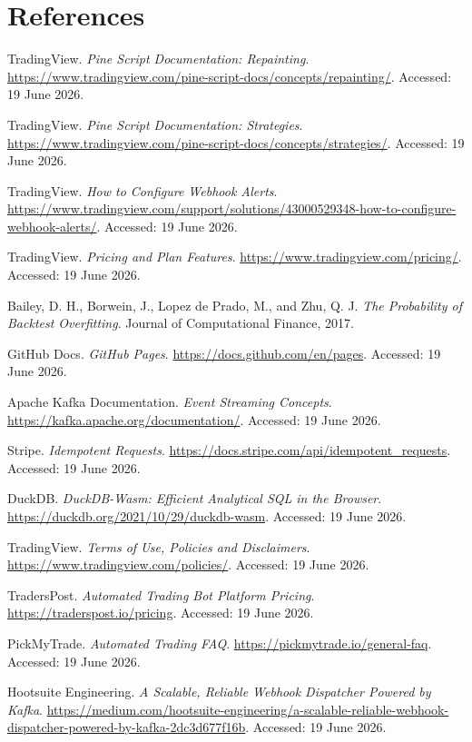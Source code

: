 \documentclass[11pt,a4paper]{article}
\begin{document}
\appendix
\section{References}
{\small
\begin{enumerate}[leftmargin=1.7em,itemsep=.15em,label={[\arabic*]}]
\item TradingView. \emph{Pine Script Documentation: Repainting}. \url{https://www.tradingview.com/pine-script-docs/concepts/repainting/}. Accessed: 19 June 2026.
\item TradingView. \emph{Pine Script Documentation: Strategies}. \url{https://www.tradingview.com/pine-script-docs/concepts/strategies/}. Accessed: 19 June 2026.
\item TradingView. \emph{How to Configure Webhook Alerts}. \url{https://www.tradingview.com/support/solutions/43000529348-how-to-configure-webhook-alerts/}. Accessed: 19 June 2026.
\item TradingView. \emph{Pricing and Plan Features}. \url{https://www.tradingview.com/pricing/}. Accessed: 19 June 2026.
\item Bailey, D. H., Borwein, J., Lopez de Prado, M., and Zhu, Q. J. \emph{The Probability of Backtest Overfitting}. Journal of Computational Finance, 2017.
\item GitHub Docs. \emph{GitHub Pages}. \url{https://docs.github.com/en/pages}. Accessed: 19 June 2026.
\item Apache Kafka Documentation. \emph{Event Streaming Concepts}. \url{https://kafka.apache.org/documentation/}. Accessed: 19 June 2026.
\item Stripe. \emph{Idempotent Requests}. \url{https://docs.stripe.com/api/idempotent_requests}. Accessed: 19 June 2026.
\item DuckDB. \emph{DuckDB-Wasm: Efficient Analytical SQL in the Browser}. \url{https://duckdb.org/2021/10/29/duckdb-wasm}. Accessed: 19 June 2026.
\item TradingView. \emph{Terms of Use, Policies and Disclaimers}. \url{https://www.tradingview.com/policies/}. Accessed: 19 June 2026.
\item TradersPost. \emph{Automated Trading Bot Platform Pricing}. \url{https://traderspost.io/pricing}. Accessed: 19 June 2026.
\item PickMyTrade. \emph{Automated Trading FAQ}. \url{https://pickmytrade.io/general-faq}. Accessed: 19 June 2026.
\item Hootsuite Engineering. \emph{A Scalable, Reliable Webhook Dispatcher Powered by Kafka}. \url{https://medium.com/hootsuite-engineering/a-scalable-reliable-webhook-dispatcher-powered-by-kafka-2dc3d677f16b}. Accessed: 19 June 2026.

\end{enumerate}}
\end{document}
